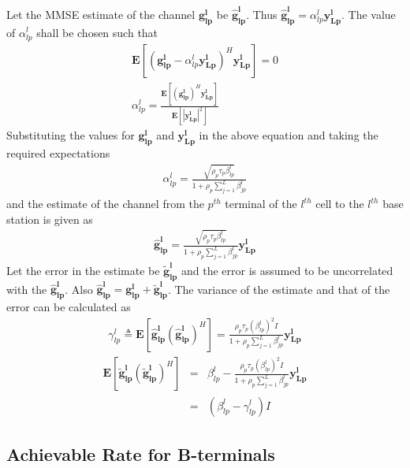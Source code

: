 \documentclass[10pt, a4paper, twoside,fleqn]{article}
\begin{document}
Let the MMSE estimate of the channel $\mathbf{g_{lp}^{l}}$ be $\mathbf{\hat g_{lp}^{l}}$. Thus $\mathbf{\hat g_{lp}^{l}} = \alpha_{lp}^{l}\mathbf{y_{Lp}^{l}}$. The value of $\alpha_{lp}^{l}$ shall be chosen such that
\begin{eqnarray*}
	\mathbf{E}[(\mathbf{g_{lp}^{l}}-\alpha_{lp}^{l}\mathbf{y_{Lp}^{l}})^H \mathbf{y_{Lp}^{l}}] = 0 \\
	\alpha_{lp}^{l} = \frac{\mathbf{E}[(\mathbf{g_{lp}^{l}})^H \mathbf{y_{Lp}^{l}}]}{\mathbf{E}[|\mathbf{y_{Lp}^{l}}|^2]}
\end{eqnarray*}
Substituting the values for $\mathbf{g_{lp}^{l}}$ and $\mathbf{y_{Lp}^{l}}$ in the above equation and taking the required expectations
\begin{eqnarray}\label{eq:alphapll}
	\alpha_{lp}^{l}=\frac{\sqrt{\rho_p \tau_p \beta_{lp}^{l}}}{1+\rho_p\sum_{j=1}^{L}\beta_{jp}^{l}}
\end{eqnarray}
and the estimate of the channel from the $p^{th}$ terminal of the $l^{th}$ cell to the $l^{th}$ base station is given as
\begin{eqnarray}\label{eq:estimatehpll}
	\mathbf{\hat g_{lp}^{l}} = \frac{\sqrt{\rho_p\tau_p\beta_{lp}^{l}}}{1+\rho_p\sum_{j=1}^{L}\beta_{jp}^{l}} \mathbf{y_{Lp}^{l}}
\end{eqnarray}
Let the error in the estimate be ${\mathbf{\widetilde{g}_{lp}^{l}}}$ and the error is assumed to be uncorrelated with the $\mathbf{\hat g_{lp}^{l}}$. Also $\mathbf{\hat g_{lp}^{l}} =\mathbf{g_{lp}^{l}}+\mathbf{\widetilde{g}_{lp}^{l}}$.
The variance of the estimate and that of the error can be calculated as
\begin{eqnarray}
	\gamma_{lp}^{l} \triangleq \mathbf{E}[\mathbf{\hat g_{lp}^{l}}(\mathbf{\hat g_{lp}^{l}})^H]
                            =      \frac{\rho_p\tau_p(\beta_{lp}^{l})^2I}{1+\rho_p\sum_{j=1}^{L}\beta_{jp}^{l}} \mathbf{y_{Lp}^{l}}
\end{eqnarray}
\begin{eqnarray}
    \mathbf{E}[\mathbf{\widetilde{g}_{lp}^{l}} (\mathbf{\widetilde{g}_{lp}^{l}})^H] &=& \beta_{lp}^{l}- \frac{\rho_p\tau_p(\beta_{lp}^{l})^2I}{1+\rho_p\sum_{j=1}^{L}\beta_{jp}^{l}} \mathbf{y_{Lp}^{l}} \nonumber\\
          									    &=& (\beta_{lp}^{l} - \gamma_{lp}^{l})I
\end{eqnarray}

\subsection{Achievable Rate for B-terminals}
\end{document}
